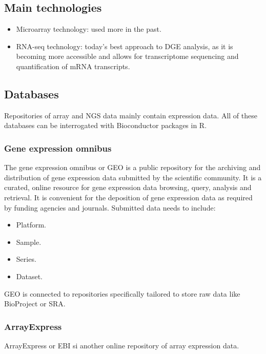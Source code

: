 	\subsection{Main technologies}

	\begin{multicols}{2}
		\begin{itemize}
			\item Microarray technology: used more in the past.
			\item RNA-seq technology: today's best approach to DGE analysis, as it is becoming more accessible and allows for transcriptome sequencing and quantification of mRNA transcripts.
		\end{itemize}
	\end{multicols}

	\subsection{Databases}
	Repositories of array and NGS data mainly contain expression data.
	All of these databases can be interrogated with Bioconductor packages in R.

		\subsubsection{Gene expression omnibus}
		The gene expression omnibus or GEO is a public repository for the archiving and distribution of gene expression data submitted by the scientific community.
		It is a curated, online resource for gene expression data browsing, query, analysis and retrieval.
		It is convenient for the deposition of gene expression data as required by funding agencies and journals.
		Submitted data needs to include:

		\begin{multicols}{4}
			\begin{itemize}
				\item Platform.
				\item Sample.
				\item Series.
				\item Dataset.
			\end{itemize}
		\end{multicols}

		GEO is connected to repositories specifically tailored to store raw data like BioProject or SRA.

		\subsubsection{ArrayExpress}
		ArrayExpress or EBI si another online repository of array expression data.

